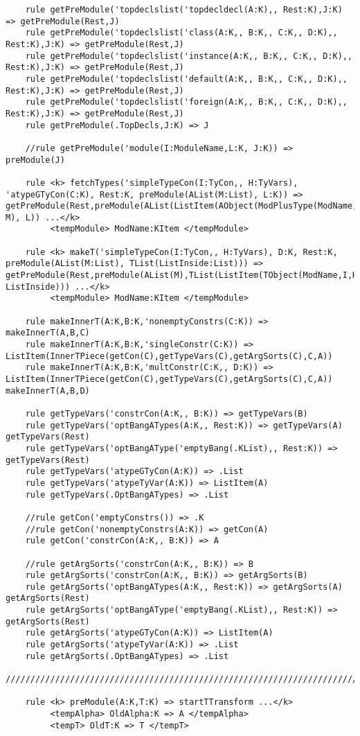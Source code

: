 \begin{lstlisting}
    rule getPreModule('topdeclslist('topdecldecl(A:K),, Rest:K),J:K) => getPreModule(Rest,J)
    rule getPreModule('topdeclslist('class(A:K,, B:K,, C:K,, D:K),, Rest:K),J:K) => getPreModule(Rest,J)
    rule getPreModule('topdeclslist('instance(A:K,, B:K,, C:K,, D:K),, Rest:K),J:K) => getPreModule(Rest,J)
    rule getPreModule('topdeclslist('default(A:K,, B:K,, C:K,, D:K),, Rest:K),J:K) => getPreModule(Rest,J)
    rule getPreModule('topdeclslist('foreign(A:K,, B:K,, C:K,, D:K),, Rest:K),J:K) => getPreModule(Rest,J)
    rule getPreModule(.TopDecls,J:K) => J

    //rule getPreModule('module(I:ModuleName,L:K, J:K)) => preModule(J)

    rule <k> fetchTypes('simpleTypeCon(I:TyCon,, H:TyVars), 'atypeGTyCon(C:K), Rest:K, preModule(AList(M:List), L:K)) => getPreModule(Rest,preModule(AList(ListItem(AObject(ModPlusType(ModName,I),C)) M), L)) ...</k>
         <tempModule> ModName:KItem </tempModule>

    rule <k> makeT('simpleTypeCon(I:TyCon,, H:TyVars), D:K, Rest:K, preModule(AList(M:List), TList(ListInside:List))) => getPreModule(Rest,preModule(AList(M),TList(ListItem(TObject(ModName,I,H,makeInnerT(I,H,D))) ListInside))) ...</k>
         <tempModule> ModName:KItem </tempModule>

    rule makeInnerT(A:K,B:K,'nonemptyConstrs(C:K)) => makeInnerT(A,B,C)
    rule makeInnerT(A:K,B:K,'singleConstr(C:K)) => ListItem(InnerTPiece(getCon(C),getTypeVars(C),getArgSorts(C),C,A))
    rule makeInnerT(A:K,B:K,'multConstr(C:K,, D:K)) => ListItem(InnerTPiece(getCon(C),getTypeVars(C),getArgSorts(C),C,A)) makeInnerT(A,B,D)

    rule getTypeVars('constrCon(A:K,, B:K)) => getTypeVars(B)
    rule getTypeVars('optBangATypes(A:K,, Rest:K)) => getTypeVars(A) getTypeVars(Rest)
    rule getTypeVars('optBangAType('emptyBang(.KList),, Rest:K)) => getTypeVars(Rest)
    rule getTypeVars('atypeGTyCon(A:K)) => .List
    rule getTypeVars('atypeTyVar(A:K)) => ListItem(A)
    rule getTypeVars(.OptBangATypes) => .List

    //rule getCon('emptyConstrs()) => .K
    //rule getCon('nonemptyConstrs(A:K)) => getCon(A)
    rule getCon('constrCon(A:K,, B:K)) => A

    //rule getArgSorts('constrCon(A:K,, B:K)) => B
    rule getArgSorts('constrCon(A:K,, B:K)) => getArgSorts(B)
    rule getArgSorts('optBangATypes(A:K,, Rest:K)) => getArgSorts(A) getArgSorts(Rest)
    rule getArgSorts('optBangAType('emptyBang(.KList),, Rest:K)) => getArgSorts(Rest)
    rule getArgSorts('atypeGTyCon(A:K)) => ListItem(A)
    rule getArgSorts('atypeTyVar(A:K)) => .List
    rule getArgSorts(.OptBangATypes) => .List

////////////////////////////////////////////////////////////////////////////////////////////////////////////////////////

    rule <k> preModule(A:K,T:K) => startTTransform ...</k>
         <tempAlpha> OldAlpha:K => A </tempAlpha>
         <tempT> OldT:K => T </tempT>
\end{lstlisting}

